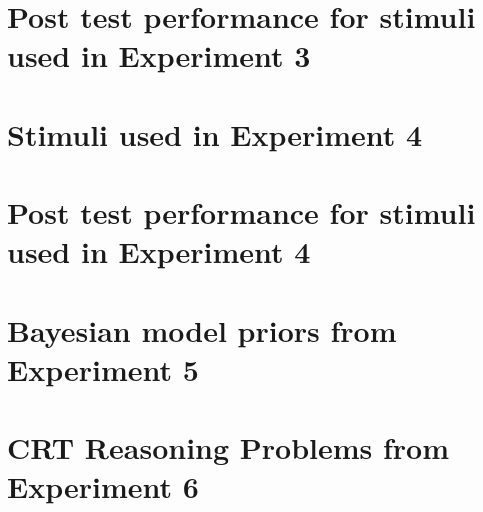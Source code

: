 \documentclass{Dissertate}
\begin{document}
\begin{appendices}
  \chapter{Post test performance for stimuli used in Experiment 3}\label{appendix:exp3_posttest}
  
  \chapter{Stimuli used in Experiment 4}\label{appendix:exp4_stimuli}
  
  \chapter{Post test performance for stimuli used in Experiment 4} \label{appendix:exp4_posttest}
  

  
  \chapter{Bayesian model priors from Experiment 5}\label{appendix:exp5_bayes}
  
  
  \chapter{CRT Reasoning Problems from Experiment 6}\label{appendix:exp6_stimuli}
  
  
\end{appendices}
\end{document}
